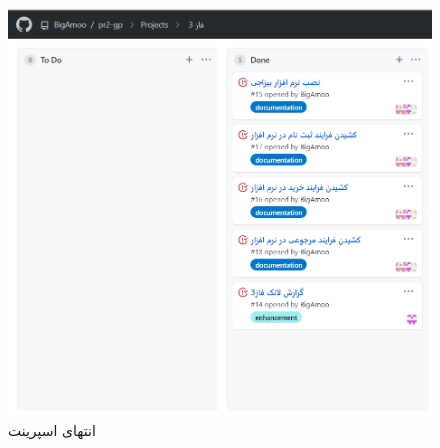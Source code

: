 \documentclass[12pt,a4paper]{article}
\begin{document}
		\begin{figure}[h!]
			\begin{center}
				\includegraphics[width=14cm]{images/screenshot_1.png}
			\end{center}
			\caption{انتهای اسپرینت}
		\end{figure}
		
		
				
\end{document}
